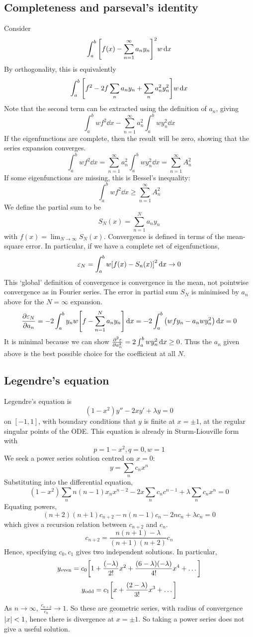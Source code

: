 \subsection{Completeness and parseval's identity}
Consider
\[
	\int_a^b \qty[ f(x) - \sum_{n=1}^\infty a_n y_n ]^2 w \dd{x}
\]
By orthogonality, this is equivalently
\[
	\int_a^b \qty[ f^2 - 2 f \sum_n a_n y_n + \sum_n a_n^2 y_n^2 ] w \dd{x}
\]
Note that the second term can be extracted using the definition of \( a_n \), giving
\[
	\int_a^b wf^2 \dd{x} - \sum_{n=1}^\infty a_n^2 \int_a^b w y_n^2 \dd{x}
\]
If the eigenfunctions are complete, then the result will be zero, showing that the series expansion converges.
\[
	\int_a^b w f^2 \dd{x} = \sum_{n=1}^\infty a_n^2 \int_a^b w y_n^2 \dd{x} = \sum_{n=1}^\infty A_n^2
\]
If some eigenfunctions are missing, this is Bessel's inequality:
\[
	\int_a^b w f^2 \dd{x} \geq \sum_{n=1}^\infty A_n^2
\]
We define the partial sum to be
\[
	S_N(x) = \sum_{n=1}^N a_n y_n
\]
with \( f(x) = \lim_{N \to \infty} S_N(x) \).
Convergence is defined in terms of the mean-square error.
In particular, if we have a complete set of eigenfunctions,
\[
	\varepsilon_N = \int_a^b w \qty[f(x) - S_n(x)]^2 \dd{x} \to 0
\]
This `global' definition of convergence is convergence in the mean, not pointwise convergence as in Fourier series.
The error in partial sum \( S_N \) is minimised by \( a_n \) above for the \( N = \infty \) expansion.
\[
	\pdv{\varepsilon_N}{a_n} = -2 \int_a^b y_n w \qty[ f - \sum_{n=1}^N a_n y_n ] \dd{x} = -2 \int_a^b \qty(wfy_n - a_n w y_n^2) \dd{x} = 0
\]
It is minimal because we can show \( \pdv[2]{\varepsilon}{a_n} = 2 \int_a^b w y_n^2 \dd{x} \geq 0 \).
Thus the \( a_n \) given above is the best possible choice for the coefficient at all \( N \).

\subsection{Legendre's equation}
Legendre's equation is
\[
	(1-x^2)y'' - 2xy' + \lambda y = 0
\]
on \( [-1,1] \), with boundary conditions that \( y \) is finite at \( x = \pm 1 \), at the regular singular points of the ODE.\@
This equation is already in Sturm-Liouville form with
\[
	p=1-x^2, q=0, w=1
\]
We seek a power series solution centred on \( x = 0 \):
\[
	y = \sum_n c_n x^n
\]
Substituting into the differential equation,
\[
	(1-x^2) \sum_n n(n-1) x_n x^{n-2} - 2x \sum_n c_n c^{n-1} + \lambda \sum_n c_n x^n = 0
\]
Equating powers,
\[
	(n+2)(n+1)c_{n+2} - n(n-1)c_n - 2n c_n + \lambda c_n = 0
\]
which gives a recursion relation between \( c_{n+2} \) and \( c_n \).
\[
	c_{n+2} = \frac{n(n+1) - \lambda}{(n+1)(n+2)} c_n
\]
Hence, specifying \( c_0, c_1 \) gives two independent solutions.
In particular,
\[
	y_{\text{even}} = c_0 \qty[1 + \frac{(-\lambda)}{2!}x^2 + \frac{(6-\lambda)(-\lambda)}{4!} x^4 + \dots]
\]
\[
	y_{\text{odd}} = c_1 \qty[x + \frac{(2-\lambda)}{3!}x^3 + \dots]
\]
As \( n \to \infty \), \( \frac{c_{n+2}}{c_n} \to 1 \).
So these are geometric series, with radius of convergence \( \abs{x} < 1 \), hence there is divergence at \( x = \pm 1 \).
So taking a power series does not give a useful solution.

